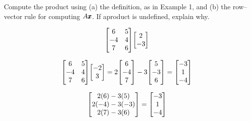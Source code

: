 \documentclass{../mathhomework}
\newenvironment{Mat}{\begin{bmatrix}}{\end{bmatrix}}
\begin{document}
\begin{problem}[1.4\#3]
    Compute the product using (a) the definition, as in Example 1, and (b) the row–vector rule for computing $A\pmb{x}$. If aproduct is undefined, explain why.

    \begin{equation*}
        \begin{Mat}
            6 & 5 \\
            -4 & 4 \\
            7 & 6
        \end{Mat}
        \begin{Mat}
            2 \\ -3
        \end{Mat}
    \end{equation*}

    \begin{solution}[Part A:]
        \begin{equation*}
            \begin{Mat}
                6 & 5 \\
                -4 & 4 \\
                7 & 6
            \end{Mat}
            \begin{Mat}
                -2 \\ 3
            \end{Mat} =
            2 \begin{Mat} 6 \\ -4 \\ 7 \end{Mat}
            - 3 \begin{Mat} 5 \\ -3 \\ 6 \end{Mat}
            =
            \begin{Mat}
                -3 \\ 1 \\ -4 
            \end{Mat}
        \end{equation*}
    \end{solution}

    \begin{solution}[Part B:]
        \begin{equation*}
            \begin{Mat}
                2(6) - 3(5) \\
                2(-4) - 3(-3) \\
                2(7) - 3(6) \\
            \end{Mat} = \begin{Mat}
                -3 \\ 1 \\ -4
            \end{Mat}
        \end{equation*}
    \end{solution}
\end{problem}
\end{document}
